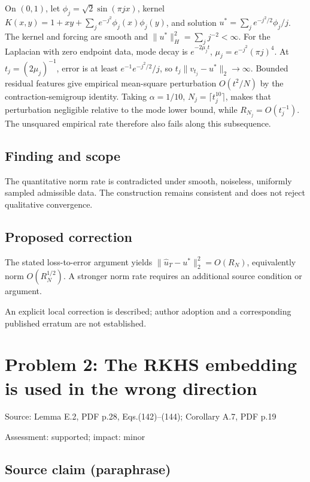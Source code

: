 \documentclass[11pt]{article}
\begin{document}
On \((0,1)\), let \(\phi_j=\sqrt2\sin(\pi jx)\), kernel \(K(x,y)=1+xy+\sum_je^{-j^2}\phi_j(x)\phi_j(y)\), and solution \(u^*=\sum_je^{-j^2/2}\phi_j/j\). The kernel and forcing are smooth and \(\|u^*\|_H^2=\sum_jj^{-2}<\infty\). For the Laplacian with zero endpoint data, mode decay is \(e^{-2\mu_jt}\), \(\mu_j=e^{-j^2}(\pi j)^4\). At \(t_j=(2\mu_j)^{-1}\), error is at least \(e^{-1}e^{-j^2/2}/j\), so \(t_j\|v_{t_j}-u^*\|_2\to\infty\). Bounded residual features give empirical mean-square perturbation \(O(t^2/N)\) by the contraction-semigroup identity. Taking \(\alpha=1/10\), \(N_j=\lceil t_j^{10}\rceil\), makes that perturbation negligible relative to the mode lower bound, while \(R_{N_j}=O(t_j^{-1})\). The unsquared empirical rate therefore also fails along this subsequence.

\subsection*{Finding and scope}

The quantitative norm rate is contradicted under smooth, noiseless, uniformly sampled admissible data. The construction remains consistent and does not reject qualitative convergence.

\subsection*{Proposed correction}

The stated loss-to-error argument yields \(\|\hat u_T-u^*\|_2^2=O(R_N)\), equivalently norm \(O(R_N^{1/2})\). A stronger norm rate requires an additional source condition or argument.

An explicit local correction is described; author adoption and a corresponding published erratum are not established.

\section*{Problem 2: The RKHS embedding is used in the wrong direction}

Source: Lemma E.2, PDF p.28, Eqs.(142)–(144); Corollary A.7, PDF p.19

Assessment: supported; impact: minor

\subsection*{Source claim (paraphrase)}
\end{document}
